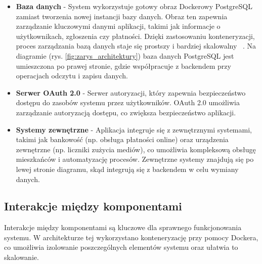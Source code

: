 \begin{itemize}
	\item \textbf{Baza danych} - System wykorzystuje gotowy obraz Dockerowy PostgreSQL zamiast tworzenia nowej instancji bazy danych. Obraz ten zapewnia zarządzanie kluczowymi danymi aplikacji, takimi jak informacje o użytkownikach, zgłoszenia czy płatności. Dzięki zastosowaniu konteneryzacji, proces zarządzania bazą danych staje się prostszy i bardziej skalowalny ~\cite{Docker-docs,vsupalov}. Na diagramie (rys. \ref{fig:zarys_architektury}) baza danych PostgreSQL jest umieszczona po prawej stronie, gdzie współpracuje z backendem przy operacjach odczytu i zapisu danych.

	\item \textbf{Serwer OAuth 2.0} - Serwer autoryzacji, który zapewnia bezpieczeństwo dostępu do zasobów systemu przez użytkowników. OAuth 2.0 umożliwia zarządzanie autoryzacją dostępu, co zwiększa bezpieczeństwo aplikacji.

	\item \textbf{Systemy zewnętrzne} - Aplikacja integruje się z zewnętrznymi systemami, takimi jak bankowość (np. obsługa płatności online) oraz urządzenia zewnętrzne (np. liczniki zużycia mediów), co umożliwia kompleksową obsługę mieszkańców i automatyzację procesów. Zewnętrzne systemy znajdują się po lewej stronie diagramu, skąd integrują się z backendem w celu wymiany danych.


\end{itemize}

\subsection{Interakcje między komponentami}

Interakcje między komponentami są kluczowe dla sprawnego funkcjonowania systemu. W architekturze tej wykorzystano konteneryzację przy pomocy Dockera, co umożliwia izolowanie poszczególnych elementów systemu oraz ułatwia to skalowanie.


